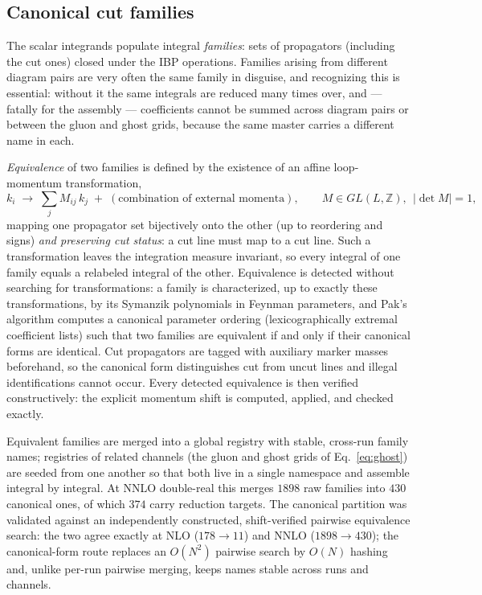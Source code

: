 \documentclass[11pt]{article}
\begin{document}
\subsection{Canonical cut families}
\label{sec:families}

The scalar integrands populate integral \emph{families}: sets of
propagators (including the cut ones) closed under the IBP operations.
Families arising from different diagram pairs are very often the same
family in disguise, and recognizing this is essential: without it the
same integrals are reduced many times over, and --- fatally for the
assembly --- coefficients cannot be summed across diagram pairs or
between the gluon and ghost grids, because the same master carries a
different name in each.

\emph{Equivalence} of two families is defined by the existence of an
affine loop-momentum transformation,
\begin{equation}
  k_i \;\longrightarrow\; \sum_j M_{ij}\, k_j
    \;+\; (\text{combination of external momenta}),
  \qquad M \in GL(L,\mathbb{Z}),\ \ |\det M| = 1,
\end{equation}
mapping one propagator set bijectively onto the other (up to
reordering and signs) \emph{and preserving cut status}: a cut line
must map to a cut line.  Such a transformation leaves the integration
measure invariant, so every integral of one family equals a relabeled
integral of the other.  Equivalence is detected without searching for
transformations: a family is characterized, up to exactly these
transformations, by its Symanzik polynomials in Feynman parameters,
and Pak's algorithm computes a canonical parameter ordering
(lexicographically extremal coefficient lists) such that two families
are equivalent if and only if their canonical forms are identical.
Cut propagators are tagged with auxiliary marker masses beforehand,
so the canonical form distinguishes cut from uncut lines and illegal
identifications cannot occur.  Every detected equivalence is then
verified constructively: the explicit momentum shift is computed,
applied, and checked exactly.

Equivalent families are merged into a global registry with stable,
cross-run family names; registries of related channels (the gluon and
ghost grids of Eq.~\eqref{eq:ghost}) are seeded from one another so
that both live in a single namespace and assemble integral by
integral.  At NNLO double-real this merges $1898$ raw families into
$430$ canonical ones, of which $374$ carry reduction targets.  The
canonical partition was validated against an independently
constructed, shift-verified pairwise equivalence search: the two
agree exactly at NLO ($178 \to 11$) and NNLO ($1898 \to 430$); the
canonical-form route replaces an $O(N^2)$ pairwise search by $O(N)$
hashing and, unlike per-run pairwise merging, keeps names stable
across runs and channels.
\end{document}

